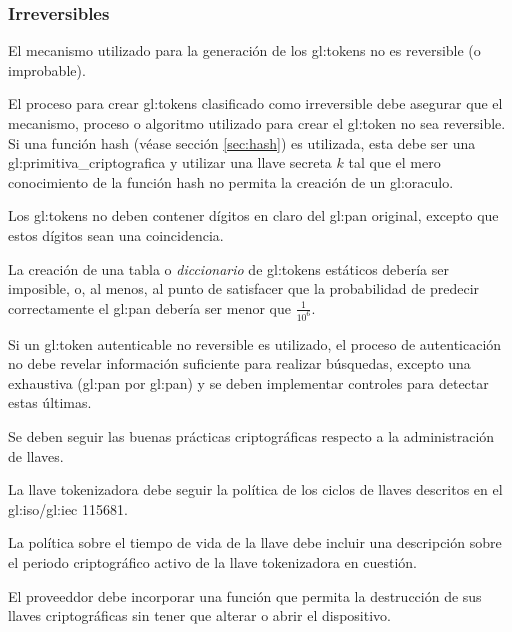 %
%

\subsubsection{Irreversibles}

{
  El mecanismo utilizado para la generación de los \glspl{gl:token}
  no es reversible (o improbable).

  {
    El proceso para crear \glspl{gl:token} clasificado como irreversible
    debe asegurar que el mecanismo, proceso o algoritmo utilizado para 
    crear el \gls{gl:token} no sea reversible. Si una función hash (véase
    sección \ref{sec:hash}) es utilizada, esta debe ser una 
    \gls{gl:primitiva_criptografica} y utilizar una llave secreta $k$ tal que
    el mero conocimiento de la función hash no permita la creación de un
    \gls{gl:oraculo}.
  }

  {
    Los \glspl{gl:token} no deben contener dígitos en claro del \gls{gl:pan}
    original, excepto que estos dígitos sean una coincidencia.
  }

  {
    La creación de una tabla o \textit{diccionario} de \glspl{gl:token}
    estáticos debería ser imposible, o, al menos, al punto de satisfacer
    que la probabilidad de predecir correctamente el \gls{gl:pan} debería ser 
    menor que $\frac{1}{10^6}$.
  }

  {
    Si un \gls{gl:token} autenticable no reversible es utilizado, el
    proceso de autenticación no debe revelar información suficiente para
    realizar búsquedas, excepto una exhaustiva (\gls{gl:pan} por 
    \gls{gl:pan}) y se deben implementar controles para detectar estas
    últimas.
  }
}

{
  Se deben seguir las buenas prácticas criptográficas respecto a la
  administración de llaves.
  
  {
    La llave tokenizadora debe seguir la política de los ciclos de llaves
    descritos en el \acrshort{gl:iso}/\acrshort{gl:iec} 115681.
  }

  {
    La política sobre el tiempo de vida de la llave debe incluir una 
    descripción sobre el periodo criptográfico activo de la llave 
    tokenizadora en cuestión.
  }

  {
   	El proveeddor debe incorporar una función que permita la destrucción
   	de sus llaves criptográficas sin tener que alterar o abrir el
   	dispositivo.  
  }
}